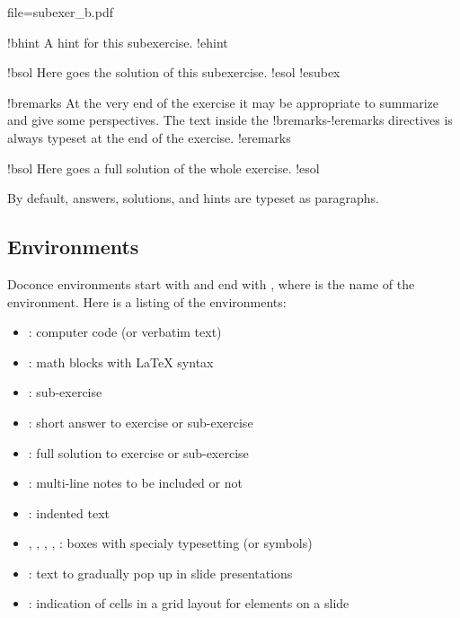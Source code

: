 \documentclass[%
oneside,                 %
final,                   %
chapterprefix=true,      %
open=right               %
10pt]{book}
\begin{document}
{file=subexer_b.pdf

!bhint
A hint for this subexercise.
!ehint

!bsol
Here goes the solution of this subexercise.
!esol
!esubex

!bremarks
At the very end of the exercise it may be appropriate to summarize
and give some perspectives. The text inside the !bremarks-!eremarks
directives is always typeset at the end of the exercise.
!eremarks

!bsol
Here goes a full solution of the whole exercise.
!esol

\eccq
By default, answers, solutions, and hints are typeset as paragraphs.

\subsection{Environments}

Doconce environments start with  and end with ,
where  is the name of the environment. Here is a listing of
the environments:

\begin{itemize}
 \item {}: computer code (or verbatim text)

 \item {}: math blocks with {\LaTeX} syntax

 \item {}: sub-exercise

 \item {}: short answer to exercise or sub-exercise

 \item {}: full solution to exercise or sub-exercise

 \item {}: multi-line notes to be included or not

 \item {}: indented text

 \item {}, , , , : boxes with
    specialy typesetting (or symbols)

 \item {}: text to gradually pop up in slide presentations

 \item {}: indication of cells in a grid layout for elements on a
   slide
\end{itemize}

}
\end{document}
